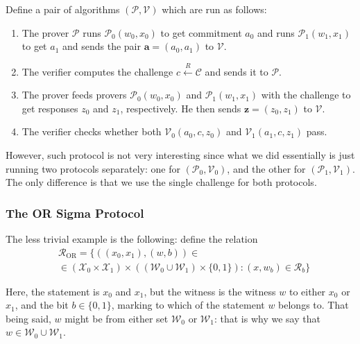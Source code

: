\documentclass[../lecture-notes.tex]{subfiles}
\begin{document}
\begin{definition}
    Define a pair of algorithms $(\mathcal{P},\mathcal{V})$ which are run as follows:
    \begin{enumerate}
        \item The prover $\mathcal{P}$ runs $\mathcal{P}_0(w_0,x_0)$ to get commitment $a_0$ and runs $\mathcal{P}_1(w_1,x_1)$ to get $a_1$ and sends the pair $\mathbf{a} = (a_0,a_1)$ to $\mathcal{V}$.
        \item The verifier computes the challenge $c \xleftarrow{R} \mathcal{C}$ and sends it to $\mathcal{P}$.
        \item The prover feeds provers $\mathcal{P}_0(w_0,x_0)$ and $\mathcal{P}_1(w_1,x_1)$ with the challenge to get responses $z_0$ and $z_1$, respectively. He then sends $\mathbf{z} = (z_0,z_1)$ to $\mathcal{V}$.
        \item The verifier checks whether both $\mathcal{V}_0(a_0,c,z_0)$ and $\mathcal{V}_1(a_1,c,z_1)$ pass.
    \end{enumerate}
\end{definition}

However, such protocol is not very interesting since what we did essentially is just running two protocols separately: one for $(\mathcal{P}_0,\mathcal{V}_0)$, and the other for $(\mathcal{P}_1,\mathcal{V}_1)$. The only difference is that we use the single challenge for both protocols.

\subsubsection{The OR Sigma Protocol}

The less trivial example is the following: define the relation
\begin{equation*}
    \begin{aligned}        
        &\mathcal{R}_{\text{OR}} = \{ ((x_0, x_1), (w, b)) \in \\
        & \in (\mathcal{X}_0 \times \mathcal{X}_1) \times ((\mathcal{W}_0 \cup \mathcal{W}_1) \times \{0,1\}): (x, w_b) \in \mathcal{R}_b \}
    \end{aligned}
\end{equation*}

Here, the statement is $x_0$ and $x_1$, but the witness is the witness $w$ to either $x_0$ or $x_1$, and the bit $b \in \{0,1\}$, marking to which of the statement $w$ belongs to. That being said, $w$ might be from either set $\mathcal{W}_0$ or $\mathcal{W}_1$: that is why we say that $w \in \mathcal{W}_0 \cup \mathcal{W}_1$.
\end{document}
